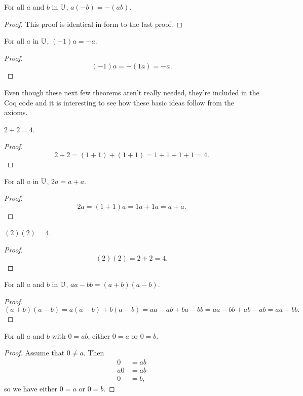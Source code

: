 \documentclass[../../math.tex]{subfiles}
\begin{document}
\begin{theorem}
    For all $a$ and $b$ in $\mathbb{U}$, $a(-b) = -(ab)$.
\end{theorem}
\begin{proof}
    This proof is identical in form to the last proof.
\end{proof}

\begin{theorem}
    For all $a$ in $\mathbb{U}$, $(-1)a = -a$.
\end{theorem}
\begin{proof}
    \[
        (-1)a = -(1a) = -a.
    \]
\end{proof}

Even though these next few theorems aren't really needed, they're included in
the Coq code and it is interesting to see how these basic ideas follow from the
axioms.

\begin{theorem}
    $2 + 2 = 4$.
\end{theorem}
\begin{proof}
    \[
        2 + 2 = (1 + 1) + (1 + 1) = 1 + 1 + 1 + 1 = 4.
    \]
\end{proof}

\begin{theorem}
    For all $a$ in $\mathbb{U}$, $2a = a + a$.
\end{theorem}
\begin{proof}
    \[
        2a = (1 + 1)a = 1a + 1a = a + a.
    \]
\end{proof}

\begin{theorem}
    $(2)(2) = 4$.
\end{theorem}
\begin{proof}
    \[
        (2)(2) = 2 + 2 = 4.
    \]
\end{proof}

\begin{theorem}
    For all $a$ and $b$ in $\mathbb{U}$, $aa - bb = (a + b) (a - b)$.
\end{theorem}
\begin{proof}
    \[
        (a + b)(a - b) = a(a - b) + b(a - b) = aa - ab + ba - bb = aa - bb + ab
        - ab = aa - bb.
    \]
\end{proof}

\begin{theorem}
    For all $a$ and $b$ with $0 = ab$, either $0 = a$ or $0 = b$.
\end{theorem}
\begin{proof}
    Assume that $0 \neq a$.  Then
    \begin{align*}
        0 &= ab \\
        a0 &= ab \\
        0 &= b,
    \end{align*}
    so we have either $0 = a$ or $0 = b$.
\end{proof}
\end{document}
